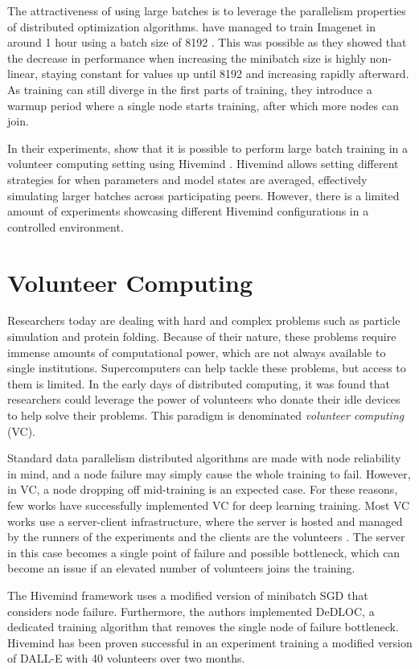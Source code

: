 The attractiveness of using large batches is to leverage the parallelism properties of distributed optimization algorithms.
\citeauthor{goyal2017accurate} have managed to train Imagenet in around 1 hour using a batch size of 8192 \cite{goyal2017accurate}.
This was possible as they showed that the decrease in performance when increasing the minibatch size is highly non-linear, staying constant for values up until 8192 and increasing rapidly afterward.
As training can still diverge in the first parts of training, they introduce a warmup period where a single node starts training, after which more nodes can join.

In their experiments, \citeauthor{ryabinin2020learning} show that it is possible to perform large batch training in a volunteer computing setting using Hivemind \cite{ryabinin2020learning, DBLP:journals/corr/abs-2106-10207}.
Hivemind allows setting different strategies for when parameters and model states are averaged, effectively simulating larger batches across participating peers.
However, there is a limited amount of experiments showcasing different Hivemind configurations in a controlled environment.

\section{Volunteer Computing}
Researchers today are dealing with hard and complex problems such as particle simulation and protein folding.
Because of their nature, these problems require immense amounts of computational power, which are not always available to single institutions.
Supercomputers can help tackle these problems, but access to them is limited.
In the early days of distributed computing, it was found that researchers could leverage the power of volunteers who donate their idle devices to help solve their problems.
This paradigm is denominated \textit{volunteer computing} (VC).

Standard data parallelism distributed algorithms are made with node reliability in mind, and a node failure may simply cause the whole training to fail.
However, in VC, a node dropping off mid-training is an expected case.
For these reasons, few works have successfully implemented VC for deep learning training.
Most VC works use a server-client infrastructure, where the server is hosted and managed by the runners of the experiments and the clients are the volunteers \cite{Atre_2021, 8886576}.
The server in this case becomes a single point of failure and possible bottleneck, which can become an issue if an elevated number of volunteers joins the training.

The Hivemind framework \cite{ryabinin2021mosphit} uses a modified version of minibatch SGD \cite{ryabinin2021mosphit} that considers node failure.
Furthermore, the authors implemented DeDLOC, a dedicated training algorithm \cite{DBLP:journals/corr/abs-2106-10207} that removes the single node of failure bottleneck.
Hivemind has been proven successful in an experiment training a modified version of DALL-E \cite{ramesh2021zero} with 40 volunteers over two months.
